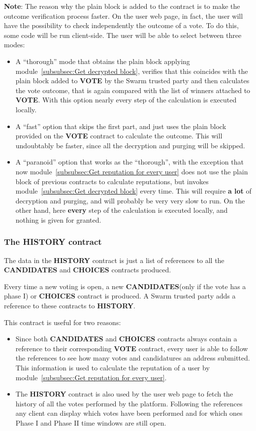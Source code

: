 \documentclass[submission, copyright,creativecommons,sharealike,noncommercial]{eptcs}
\newcommand{\Candidates}{\textbf{CANDIDATES}\xspace}
\newcommand{\Choices}{\textbf{CHOICES}\xspace}
\newcommand{\Vote}{\textbf{VOTE}\xspace}
\newcommand{\History}{\textbf{HISTORY}\xspace}
\begin{document}
	\textbf{Note}: The reason why the plain block is added to the contract is to make the outcome verification process faster. On the user web page, in fact, the user will have the possibility to check independently the outcome of a vote. To do this, some code will be run client-side. The user will be able to select between three modes:
	\begin{itemize}
		\item A ``thorough'' mode that obtains the plain block applying module~\ref{subsubsec:Get decrypted block}, verifies that this coincides with the plain block added to \Vote by the Swarm trusted party and then calculates the vote outcome, that is again compared with the list of winners attached to \Vote. With this option nearly every step of the calculation is executed locally.
		
		\item A ``fast'' option that skips the first part, and just uses the plain block provided on the \Vote contract to calculate the outcome. This will undoubtably be faster, since all the decryption and purging will be skipped.
		
		\item A ``paranoid'' option that works as the ``thorough'', with the exception that now module~\ref{subsubsec:Get reputation for every user} does not use the plain block of previous contracts to calculate reputations, but invokes module~\ref{subsubsec:Get decrypted block} every time. This will require \textbf{a lot} of decryption and purging, and will probably be very very slow to run. On the other hand, here \textbf{every} step of the calculation is executed locally, and nothing is given for granted.
	\end{itemize} 
%
%
\subsubsection{The \History contract}\label{subsubsec:The reputation contract}
	The data in the \History contract is just a list of references to all the \Candidates and \Choices contracts produced. 
	
	Every time a new voting is open, a new \Candidates (only if the vote has a phase I) or \Choices contract is produced. A Swarm trusted party adds a reference to these contracts to \History. 
	
	This contract is useful for two reasons:
	\begin{itemize}
		\item Since both \Candidates and \Choices contracts always contain a reference to their corresponding \Vote contract, every user is able to follow the references to see how many votes and candidatures an address submitted. This information is used to calculate the reputation of a user by module~\ref{subsubsec:Get reputation for every user}.
		
		\item The \History contract is also used by the user web page to fetch the history of all the votes performed by the platform. Following the references any client can display which votes have been performed and for which ones Phase I and Phase II time windows are still open.
	\end{itemize}
%
%	
\end{document}
